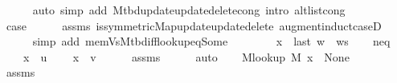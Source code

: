 \begin{isabellebody}
\ \ \ \ \isamarkupfalse%
\ {\isacharparenleft}{\kern0pt}auto\ simp\ add{\isacharcolon}{\kern0pt}\ M{\isacharunderscore}{\kern0pt}tbd{\isacharunderscore}{\kern0pt}update{\isacharunderscore}{\kern0pt}update{\isacharunderscore}{\kern0pt}delete{\isacharunderscore}{\kern0pt}cong\ intro{\isacharcolon}{\kern0pt}\ alt{\isacharunderscore}{\kern0pt}list{\isacharunderscore}{\kern0pt}cong{\isacharparenright}{\kern0pt}\isanewline
{}\isamarkupfalse%
\isanewline
\ \ \isamarkupfalse%
\ {}\isanewline
\ \ \isamarkupfalse%
\ {\isacharquery}{\kern0pt}case\isanewline
\ \ \ \ \isamarkupfalse%
\ assms\ is{\isacharunderscore}{\kern0pt}symmetric{\isacharunderscore}{\kern0pt}Map{\isacharunderscore}{\kern0pt}update{\isacharunderscore}{\kern0pt}update{\isacharunderscore}{\kern0pt}delete\ augment{\isacharunderscore}{\kern0pt}induct{\isacharunderscore}{\kern0pt}case{\isacharunderscore}{\kern0pt}{}D{\isacharparenleft}{\kern0pt}{}{}{\isacharparenright}{\kern0pt}\isanewline
\ \ \ \ \isamarkupfalse%
\ {\isacharparenleft}{\kern0pt}simp\ add{\isacharcolon}{\kern0pt}\ mem{\isacharunderscore}{\kern0pt}Vs{\isacharunderscore}{\kern0pt}M{\isacharunderscore}{\kern0pt}tbd{\isacharunderscore}{\kern0pt}iff{\isacharunderscore}{\kern0pt}lookup{\isacharunderscore}{\kern0pt}eq{\isacharunderscore}{\kern0pt}Some{\isacharparenright}{\kern0pt}\isanewline
{}\isamarkupfalse%
\isanewline
\ \ \isamarkupfalse%
\ {}\isanewline
\ \ \isamarkupfalse%
\ {\isacharquery}{\kern0pt}x\ {\isacharequal}{\kern0pt}\ {\isachardoublequoteopen}last\ {\isacharparenleft}{\kern0pt}w\ {\isacharhash}{\kern0pt}\ ws{\isacharparenright}{\kern0pt}{\isachardoublequoteclose}\isanewline
\ \ \isamarkupfalse%
\ neq{\isacharcolon}{\kern0pt}\isanewline
\ \ \ \ {\isachardoublequoteopen}{\isacharquery}{\kern0pt}x\ {\isasymnoteq}\ u{\isachardoublequoteclose}\isanewline
\ \ \ \ {\isachardoublequoteopen}{\isacharquery}{\kern0pt}x\ {\isasymnoteq}\ v{\isachardoublequoteclose}\isanewline
\ \ \ \ \isamarkupfalse%
\ assms{\isacharparenleft}{\kern0pt}{}{\isacharparenright}{\kern0pt}\isanewline
\ \ \ \ \isamarkupfalse%
\ auto\isanewline
\ \ \isamarkupfalse%
\ {\isachardoublequoteopen}M{\isacharunderscore}{\kern0pt}lookup\ M\ {\isacharquery}{\kern0pt}x\ {\isacharequal}{\kern0pt}\ None{\isachardoublequoteclose}\isanewline
\ \ \ \ \isamarkupfalse%
\ assms{\isacharparenleft}{\kern0pt}{}{\isacharcomma}{\kern0pt}\ {}{\isacharparenright}{\kern0pt}\isanewline

\end{isabellebody}
